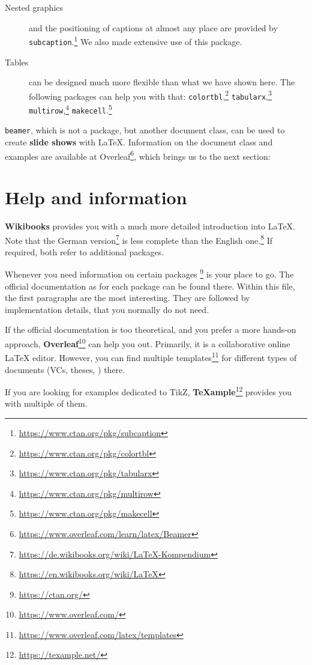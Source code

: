 \begin{description}
	\item[Nested graphics]
		and the positioning of captions at almost any place are provided by  
		\texttt{subcaption}.\footnote{\url{https://www.ctan.org/pkg/subcaption}}
		We also made extensive use of this package.
	\item[Tables]
		can be designed much more flexible than what we have shown here. 
		The following packages can help you with that:
		\texttt{colortbl},\footnote{\url{https://www.ctan.org/pkg/colortbl}}
		\texttt{tabularx},\footnote{\url{https://www.ctan.org/pkg/tabularx}}
		\texttt{multirow},\footnote{\url{https://www.ctan.org/pkg/multirow}}
		\texttt{makecell}.\footnote{\url{https://www.ctan.org/pkg/makecell}}
\end{description}

\noindent \texttt{beamer}, which is not a package, but another document class, can be used to create \textbf{slide shows}
with \LaTeX{}. Information on the document class and examples are available at Overleaf\footnote{\url{https://www.overleaf.com/learn/latex/Beamer}}, which brings us to the next section:

\section{Help and information}

\textbf{Wikibooks} provides you with a much more detailed introduction into \LaTeX{}. Note that the German version\footnote{\url{https://de.wikibooks.org/wiki/LaTeX-Kompendium}} is less complete than the English one.\footnote{\url{https://en.wikibooks.org/wiki/LaTeX}}
If required, both refer to additional packages.

Whenever you need information on certain packages \footnote{\url{https://ctan.org/}} is your place to go. The official documentation as  for each package can be found there.
Within this file, the first paragraphs are the most interesting. They are 
followed by implementation details, that you normally do not need.

If the official documentation is too theoretical, and you prefer a more hands-on approach, \textbf{Overleaf}\footnote{\url{https://www.overleaf.com/}} can help you out.
Primarily, it is a collaborative online \LaTeX{} editor. However, you can find multiple templates\footnote{\url{https://www.overleaf.com/latex/templates}} for different types of documents (VCs, theses, \textellipsis) there.

If you are looking for examples dedicated to TikZ, \textbf{\TeX{}ample}\footnote{\url{https://texample.net/}} provides you with multiple of them.


